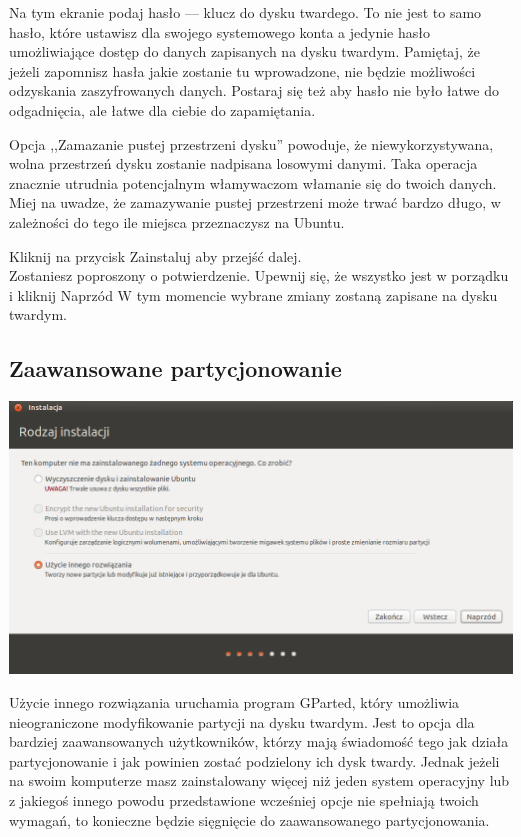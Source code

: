 Na tym ekranie podaj hasło --- klucz do dysku twardego. To nie jest to samo hasło, które ustawisz dla swojego systemowego konta a jedynie hasło umożliwiające dostęp do danych zapisanych na dysku twardym. Pamiętaj, że jeżeli zapomnisz hasła jakie zostanie tu wprowadzone, nie będzie możliwości odzyskania zaszyfrowanych danych. Postaraj się też aby hasło nie było łatwe do odgadnięcia, ale łatwe dla ciebie do zapamiętania.

Opcja ,,Zamazanie pustej przestrzeni dysku'' powoduje, że niewykorzystywana, wolna przestrzeń dysku zostanie nadpisana losowymi danymi. Taka operacja znacznie utrudnia potencjalnym włamywaczom włamanie się do twoich danych. Miej na uwadze, że zamazywanie pustej przestrzeni może trwać bardzo długo, w zależności do tego ile miejsca przeznaczysz na Ubuntu.
\begin{flushright}
Kliknij na przycisk \textcolor{ubuntu_orange}{Zainstaluj} aby przejść dalej.\\
Zostaniesz poproszony o potwierdzenie. Upewnij się, że wszystko jest w porządku i kliknij \textcolor{ubuntu_orange}{Naprzód}
W tym momencie wybrane zmiany zostaną zapisane na dysku twardym.\\
\end{flushright}
\clearpage
\subsection{Zaawansowane partycjonowanie}
\begin{center}
        \includegraphics[width=\linewidth]{images/instalator_partycjonowanie_gparted1.png}
\end{center}

\textcolor{ubuntu_orange}{Użycie innego rozwiązania} uruchamia program GParted, który umożliwia nieograniczone modyfikowanie partycji na dysku twardym. Jest to opcja dla bardziej zaawansowanych użytkowników, którzy mają świadomość tego jak działa partycjonowanie i jak powinien zostać podzielony ich dysk twardy. Jednak jeżeli na swoim komputerze masz zainstalowany więcej niż jeden system operacyjny lub z jakiegoś innego powodu przedstawione wcześniej opcje nie spełniają twoich wymagań, to konieczne będzie sięgnięcie do zaawansowanego partycjonowania.


